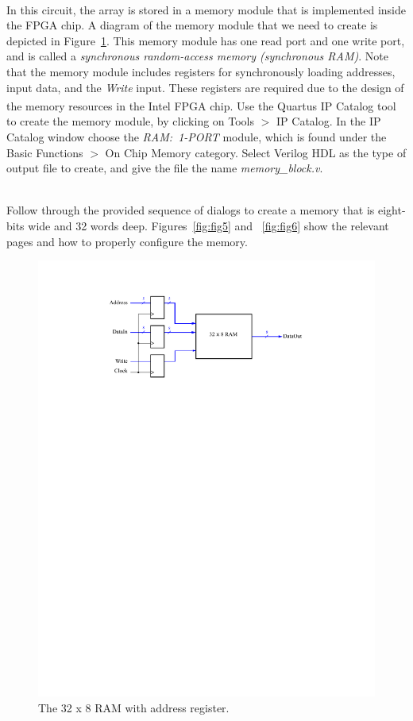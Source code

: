 \documentclass[epsfig,10pt,fullpage]{article}
\begin{document}
~\\
In this circuit, the array is stored in a memory module that is implemented inside the
FPGA chip. 
A diagram of the memory module that we need to create is depicted in Figure~\ref{fig:fig_RAM}.
This memory module has one read port and one write port, and is called a {\it synchronous 
random-access memory (synchronous RAM)}. Note that the memory module includes registers for 
synchronously loading addresses, input data, and the {\it Write} input. These registers
are required due to the design of the memory 
resources in the Intel\textsuperscript{\textregistered} FPGA chip. Use the Quartus\textsuperscript{\textregistered} IP Catalog tool to create the memory 
module, by clicking on 
{\sf Tools} $>$ {\sf IP Catalog}. In the IP Catalog window choose the {\it RAM:~1-PORT} module,
which is found under the {\sf Basic Functions $>$  On Chip Memory} category.  
Select {\sf Verilog HDL} as the type of output file to create, and give the file the name 
{\it memory\_block.v}.

~\\
Follow through the provided sequence of dialogs to create a memory that is eight-bits wide
and 32 words deep. Figures~\ref{fig:fig5} and ~\ref{fig:fig6} show the 
relevant pages and how to properly configure the memory. 

\begin{figure}[H]
	\begin{center}
		\includegraphics[]{figures/figure_RAM.pdf}
	\end{center}
	\caption{The 32 {\sf x} 8 RAM with address register.}
	\label{fig:fig_RAM}
\end{figure}
\end{document}
